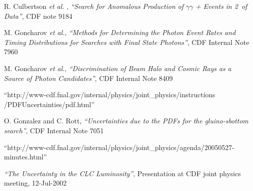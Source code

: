 \begin{thebibliography}{1}
 R. Culbertson \textit{et al.} , \textit{``Search for Anomalous Production of $\gamma\gamma$ + \met Events in 2~\fbi of Data''}, CDF note 9184

 M. Goncharov \textit{et al.}, \textit{``Methods for Determining the Photon Event Rates and Timing Distributions for Searches with Final State Photons''}, CDF Internal Note 7960

 M. Goncharov \textit{et al.}, \textit{``Discrimination of Beam Halo and Cosmic Rays as a Source of Photon Candidates''}, CDF Internal Note 8409

 ``http://www-cdf.fnal.gov/internal/physics/joint\_physics/instructions /PDFUncertainties/pdf.html''

 O. Gonzalez and C. Rott, \textit{``Uncertainties due to the PDFs for the gluino-sbottom search''}, CDF Internal Note 7051

 ``http://www-cdf.fnal.gov/internal/physics/joint\_physics/agenda/20050527-minutes.html''

\textit{``The Uncertainty in the CLC Luminosity''}, Presentation at CDF joint physics meeting, 12-Jul-2002






\end{thebibliography}

